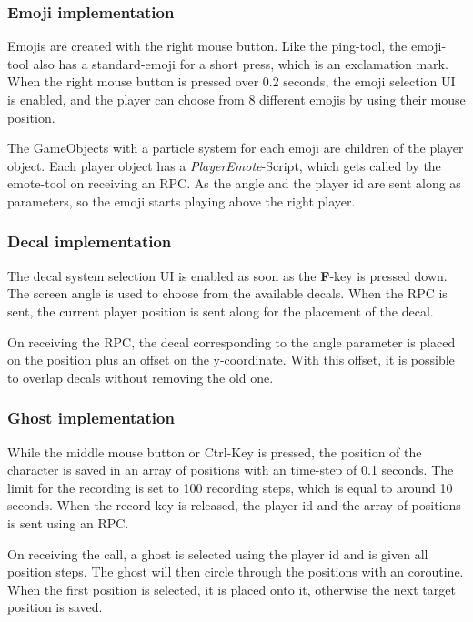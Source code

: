 \subsubsection{Emoji implementation}

Emojis are created with the right mouse button. Like the ping-tool, the emoji-tool also has a standard-emoji for a short press, which is an exclamation mark.
When the right mouse button is pressed over 0.2 seconds, the emoji selection UI is enabled, and the player can choose from 8 different emojis by using their mouse position.

The GameObjects with a particle system for each emoji are children of the player object.
Each player object has a \textit{PlayerEmote}-Script, which gets called by the emote-tool on receiving an RPC. As the angle and the player id are sent along as parameters, so the emoji starts playing above the right player.

\subsubsection{Decal implementation}

The decal system selection UI is enabled as soon as the \textbf{F}-key is pressed down. The screen angle is used to choose from the available decals. When the RPC is sent, the current player position is sent along for the placement of the decal.

On receiving the RPC, the decal corresponding to the angle parameter is placed on the position plus an offset on the y-coordinate. With this offset, it is possible to overlap decals without removing the old one.

\subsubsection{Ghost implementation}

While the middle mouse button or Ctrl-Key is pressed, the position of the character is saved in an array of positions with an time-step of 0.1 seconds. The limit for the recording is set to 100 recording steps, which is equal to around 10 seconds.
When the record-key is released, the player id and the array of positions is sent using an RPC.

On receiving the call, a ghost is selected using the player id and is given all position steps. The ghost will then circle through the positions with an coroutine. When the first position is selected, it is placed onto it, otherwise the next target position is saved. 

